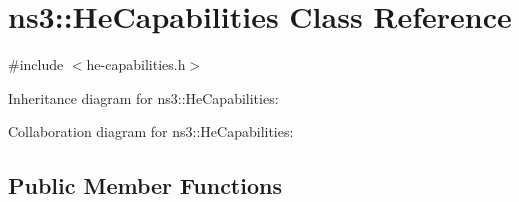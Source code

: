 \hypertarget{classns3_1_1HeCapabilities}{}\section{ns3\+:\+:He\+Capabilities Class Reference}
\label{classns3_1_1HeCapabilities}


{\ttfamily \#include $<$he-\/capabilities.\+h$>$}



Inheritance diagram for ns3\+:\+:He\+Capabilities\+:


Collaboration diagram for ns3\+:\+:He\+Capabilities\+:
\subsection*{Public Member Functions}
